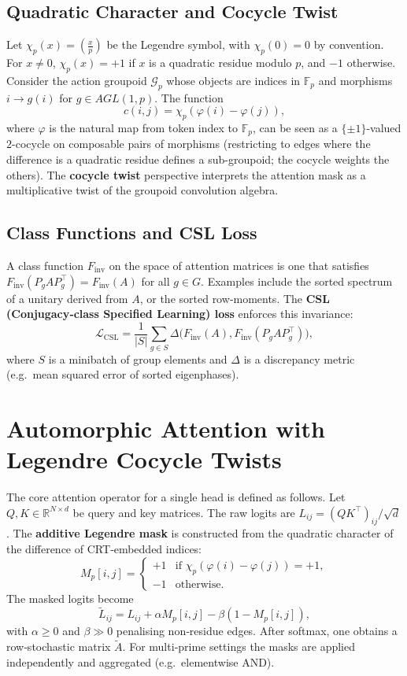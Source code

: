 \documentclass[12pt]{article}
\theoremstyle{plain}
\theoremstyle{definition}
\theoremstyle{remark}
\begin{document}
\subsection{Quadratic Character and Cocycle Twist}
Let $\chi_p(x) = \left(\frac{x}{p}\right)$ be the Legendre symbol, with $\chi_p(0)=0$ by convention. For $x \neq 0$, $\chi_p(x) = +1$ if $x$ is a quadratic residue modulo $p$, and $-1$ otherwise. Consider the action groupoid $\mathcal{G}_p$ whose objects are indices in $\mathbb{F}_p$ and morphisms $i \to g(i)$ for $g \in AGL(1,p)$. The function
\[
c(i,j) = \chi_p(\varphi(i) - \varphi(j)),
\]
where $\varphi$ is the natural map from token index to $\mathbb{F}_p$, can be seen as a $\{\pm1\}$-valued $2$-cocycle on composable pairs of morphisms (restricting to edges where the difference is a quadratic residue defines a sub-groupoid; the cocycle weights the others). The \textbf{cocycle twist} perspective interprets the attention mask as a multiplicative twist of the groupoid convolution algebra.

\subsection{Class Functions and CSL Loss}
A class function $F_{\text{inv}}$ on the space of attention matrices is one that satisfies $F_{\text{inv}}(P_g A P_g^\top) = F_{\text{inv}}(A)$ for all $g \in G$. Examples include the sorted spectrum of a unitary derived from $A$, or the sorted row‑moments. The \textbf{CSL (Conjugacy‑class Specified Learning) loss} enforces this invariance:
\[
\mathcal{L}_{\text{CSL}} = \frac{1}{|S|} \sum_{g \in S} \Delta\big( F_{\text{inv}}(A), F_{\text{inv}}(P_g A P_g^\top) \big),
\]
where $S$ is a minibatch of group elements and $\Delta$ is a discrepancy metric (e.g.\ mean squared error of sorted eigenphases).

\section{Automorphic Attention with Legendre Cocycle Twists}
\label{sec:att}

The core attention operator for a single head is defined as follows. Let $Q,K \in \mathbb{R}^{N \times d}$ be query and key matrices. The raw logits are $L_{ij} = (Q K^\top)_{ij} / \sqrt{d}$. The \textbf{additive Legendre mask} is constructed from the quadratic character of the difference of CRT‑embedded indices:
\[
M_p[i,j] = \begin{cases}
+1 & \text{if } \chi_p(\varphi(i)-\varphi(j)) = +1,\\
-1 & \text{otherwise}.
\end{cases}
\]
The masked logits become
\[
\tilde{L}_{ij} = L_{ij} + \alpha M_p[i,j] - \beta (1 - M_p[i,j]),
\]
with $\alpha \ge 0$ and $\beta \gg 0$ penalising non‑residue edges. After softmax, one obtains a row‑stochastic matrix $\tilde{A}$. For multi‑prime settings the masks are applied independently and aggregated (e.g.\ elementwise AND).
\end{document}
